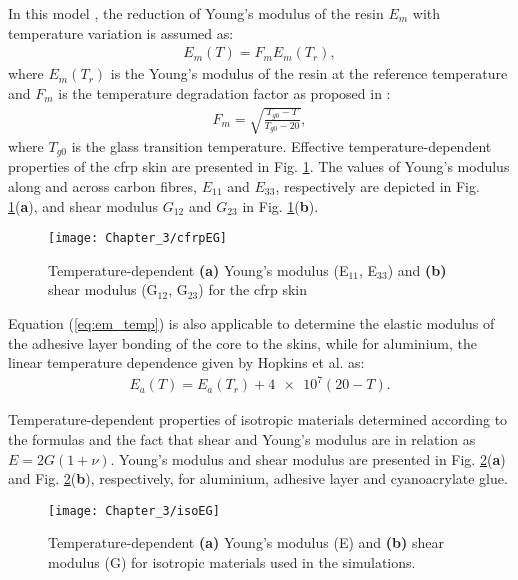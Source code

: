 In this model \cite{salamone2009guided, hopkins2012extreme}, the reduction of Young’s modulus of the resin \(E_m\) with temperature variation is assumed as:
\begin{eqnarray}
	E_m(T)=F_m E_{m}(T_r),
	\label{eq:factor_temp}
\end{eqnarray}
%
%
%
where \(E_{m}(T_r)\) is the Young’s modulus of the resin at the reference temperature and \(F_m\) is the temperature degradation factor as proposed in \cite{chamis1983simplified}:
\begin{eqnarray}
F_m=\sqrt{\frac{T_{g0}-T}{T_{g0}-20}},
\label{eq:em_temp}
\end{eqnarray}
%
%
where \(T_{g0}\) is the glass transition temperature.
Effective temperature-dependent properties of the \ac{cfrp} skin are presented in Fig. \ref{fig:cfrpEG}.
The values of Young's modulus along and across carbon fibres, \(E_{11}\) and \(E_{33}\), respectively are depicted in Fig. \ref{fig:cfrpEG}(\textbf{a}), and shear modulus \(G_{12}\) and \(G_{23}\) in Fig. \ref{fig:cfrpEG}(\textbf{b}).

\begin{figure}
	\begin{center}
		\texttt{[image: Chapter\_3/cfrpEG]}
	\end{center}
	\caption{Temperature-dependent \textbf{(a)} Young's modulus (E\(_{11}\), E\(_{33}\)) and \textbf{(b)} shear modulus (G\(_{12}\), G\(_{23}\)) for the \acf{cfrp} skin}
	\label{fig:cfrpEG}
\end{figure}

Equation (\ref{eq:em_temp}) is also applicable to determine the elastic modulus of the adhesive layer bonding of the core to the skins, while for aluminium, the linear temperature dependence given by Hopkins et al. \cite{hopkins2012extreme} as:
\begin{eqnarray}
	E_a(T)=E_a(T_{r})+\num{4e7}(20-T).
	\label{eq:aluminium_temp}
\end{eqnarray}

Temperature-dependent properties of isotropic materials determined according to the formulas and the fact that shear and Young's modulus are in relation as \(E=2G(1+\nu)\).
Young's modulus and shear modulus are presented in Fig. \ref{fig:isoEG}(\textbf{a}) and Fig. \ref{fig:isoEG}(\textbf{b}), respectively, for aluminium, adhesive layer and cyanoacrylate glue.
\begin{figure}
	\begin{center}
		\texttt{[image: Chapter\_3/isoEG]}
	\end{center}
	\caption{Temperature-dependent \textbf{(a)} Young's modulus (E) and \textbf{(b)} shear modulus (G) for isotropic materials used in the simulations.}
	\label{fig:isoEG}
\end{figure}

